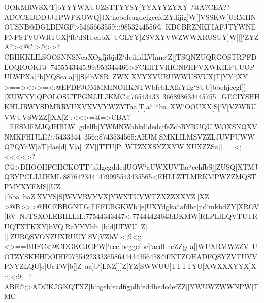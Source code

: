 {{{ OOKMRWSX`T]bYYYWXUUZSTTYYSY[YYXYYZYXY}
 \hbox{?@A?CEA??ADCCEDDDJJTPWPKOWQ]JX`hebefcagdcfgeefdZYdijig]W[[VSSKW[URMHNOUSNB@DGLDINGF>5465663559::;9853244556@%
 KDCBRZNKFIAFJTYWNEFNPSTVUWRTUX]`fb`dSIUcabX%
 UGLYY]ZSVXYVWZWWXRUSUY]W][[`ZYZ}
 \hbox{A?><@?;>@>>?CBHKKLILSOOSNNSNcaXOgfjibjdZ`dcihidLVhmc`Z[]TSQNZUQRGOSTRPFDLOQIOOKI@%
 7455543445:99:953344466>FCEHTVIHGNFHPVXWKILPUUOPULWPXa[``b]YQSca`a]`[[S[dbVSR%
 ZWX[XYYXVURUWWUSVUX]T[YY`[XY}
 \hbox{>==><>>=<;@EFDFJOMMMINOHKNTWbfebLXfhYiig`SUU]bbehjccgf]][XUWNY[QPOLOSUTPGNJJLJKMC<76543433%
 366898634445755=GECIYSHHKHLJRWYSDMRRVUXVXVVYWZYTaa[T]a`````ba%
 XW`OOUXX[S[`V[VZWRUVWUVSWZZ[]XX[Z}
 \hbox{;<<>=@=>CBA?=EESMFMJQJHBLW]]gdelfb]YWfdNWabkd`dedcjfeZcbRYRUQU[WOXSNQXVNMKFHIJLE?:75433344%
 356::8743534565:AHJM[SMKLILMSVZZLJUVPUWWQPQYaW[aT[dae]d[]V]a[%
 ZV][TTU[P[]WTZXXSYZXYW[XUXZZSa[[[[}
 \hbox{=<;<<<<>?C@>DHOOIIFGHCKOTT`bfdgcgddedUOW`aUWXUVTac`eehfbS]]ZUSQ]XTMJQRYPCLJJJHML;887642344%
 479995543435565<EHLLZTLMRKMPWZZMQSTPMYXYEMS[]UZ][`bba%
 baZ]XVYS[S[WVVRVYVX[YWXTUVWTZXZZXXYZ[[XZ}
 \hbox{>@B>>>@HCFBBGNTG;FFFEBGKWb`]e]UXYdgka``afdhc]jid`mkbdZY[XROV[RV%
 NJTSXOLEBHLLIL:77544343447<:77444424643:DKMW[RLPLILQVTUTRUQTXTKXY[bVQ]RaYYYbb%
 ]b`d]LTWU][Z][[[ZURQSVONZUXRUUY[SV]VZbV}
 \hbox{<;9<;;<>==BHFC<@CDGKGJGPW]`eccfbeggefbc]`acdhheZZgda[]WUXRMWZZV%
 UOTZYSKHHDOIHF97554223333658644434356458@FKTZOHADFQSYZVTUVVPNYZLQU]c]UcTW[b[]Z%
 aa]b`[LNZ]]]Z[YZ[SWWUU[TTTTYU[XWXXXYYX]X}
 \hbox{::;<:9;=?ABE@;>ADCKJGKQTXZ]b`cgeb`ecdfigjdb`eddbedcdefZZ[]YWUWZWWNPW[TMG%
}}}
